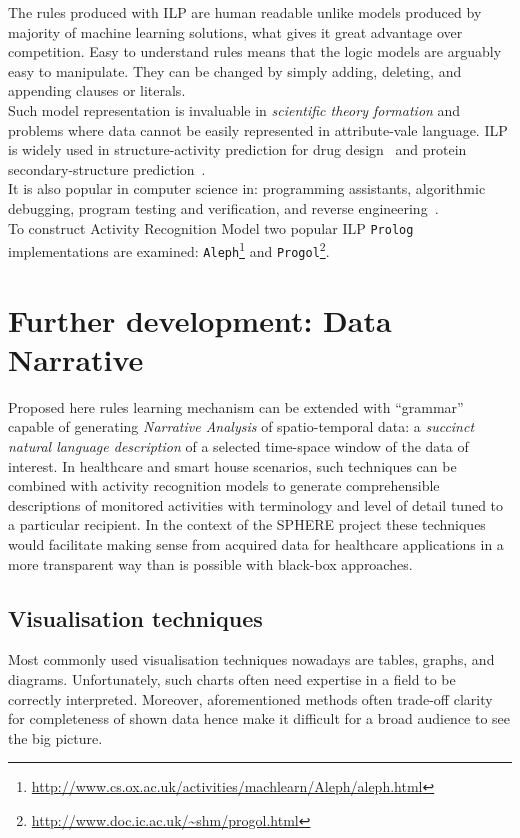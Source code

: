 \documentclass[12pt, a4paper, pdflatex, leqno, twoside]{report}
\begin{document}
The rules produced with ILP are human readable unlike models produced by majority of machine learning solutions, what gives it great advantage over competition. Easy to understand rules means that the logic models are arguably easy to manipulate. They can be changed by simply adding, deleting, and appending clauses or literals.\\

Such model representation is invaluable in \emph{scientific theory formation} and problems where data cannot be easily represented in attribute-vale language. ILP is widely used in structure-activity prediction for drug design~\citep{king1992drug,michael1992modelling} and protein secondary-structure prediction~\citep{muggleton1992protein}.\\
It is also popular in computer science in: programming assistants, algorithmic debugging, program testing and verification, and reverse engineering~\citep{shapiro1983algorithmic,bergadno1993inductive,bratko1993inductive}.\\

To construct Activity Recognition Model two popular ILP \texttt{Prolog} implementations are examined: \texttt{Aleph}\footnote{\url{http://www.cs.ox.ac.uk/activities/machlearn/Aleph/aleph.html}} and \texttt{Progol}\footnote{\url{http://www.doc.ic.ac.uk/~shm/progol.html}}.


\section{Further development: Data Narrative\label{sec:narrative}}
Proposed here rules learning mechanism can be extended with ``grammar'' capable of generating \emph{Narrative Analysis} of spatio-temporal data: a \emph{succinct natural language description} of a selected time-space window of the data of interest. In healthcare and smart house scenarios, such techniques can be combined with activity recognition models to generate comprehensible descriptions of monitored activities with terminology and level of detail tuned to a particular recipient. In the context of the SPHERE project these techniques would facilitate making sense from acquired data for healthcare applications in a more transparent way than is possible with black-box approaches.

  \subsection{Visualisation techniques}
Most commonly used visualisation techniques nowadays are tables, graphs, and diagrams. Unfortunately, such charts often need expertise in a field to be correctly interpreted. Moreover, aforementioned methods often trade-off clarity for completeness of shown data hence make it difficult for a broad audience to see the big picture.\\
\end{document}
